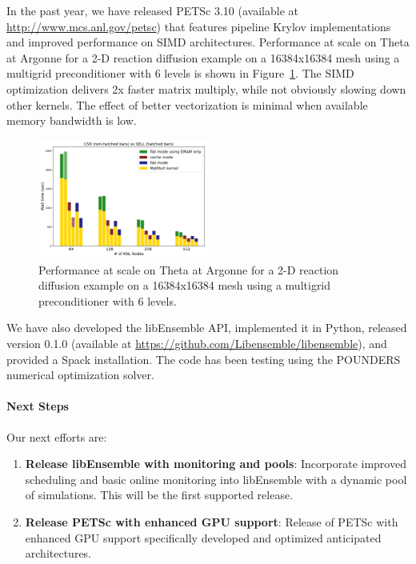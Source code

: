 In the past year, we have released PETSc 3.10 (available at \url{http://www.mcs.anl.gov/petsc})
that features pipeline Krylov implementations and improved performance on SIMD
architectures.  Performance at scale on Theta at Argonne for a 2-D reaction 
diffusion example on a 16384x16384 mesh using a multigrid preconditioner with 
6 levels is shown in Figure~\ref{fig:petsc-tao-fig}. The SIMD optimization 
delivers 2x faster matrix multiply, while not obviously slowing down other 
kernels.  The effect of better vectorization is minimal when available 
memory bandwidth is low.

\begin{figure}
\centering
\includegraphics[width=0.5\textwidth]{projects/2.3.3-MathLibs/2.3.3.06-PETSc-TAO/aij_vs_sell}
\caption{Performance at scale on Theta at Argonne for a 2-D reaction diffusion 
example on a 16384x16384 mesh using a multigrid preconditioner with 
6 levels.}
\label{fig:petsc-tao-fig}
\end{figure}

We have also developed the libEnsemble API, implemented it in Python, released 
version 0.1.0 (available at \url{https://github.com/Libensemble/libensemble}),
and provided a Spack installation.  The code has been testing using the
POUNDERS numerical optimization solver.

\paragraph{Next Steps}

Our next efforts are:
\begin{enumerate}
  \item \textbf{Release libEnsemble with monitoring and pools}: Incorporate improved scheduling 
    and basic online monitoring into libEnsemble with a dynamic pool of simulations.  This will
    be the first supported release.
  \item \textbf{Release PETSc with enhanced GPU support}: Release of PETSc with enhanced GPU 
    support specifically developed and optimized anticipated architectures.
\end{enumerate}

